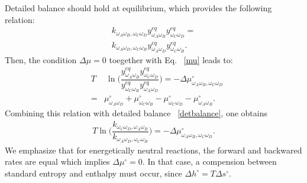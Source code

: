 \documentclass[
	amsmath,
	amssymb,
	a4paper,
	aip,		%
	jcp,		%
	reprint, twocolumn  %
	fleqn,
	showpacs,
	floatfix
]{revtex4-1}
\newcommand{\bea}{\begin{eqnarray}}
\newcommand{\eea}{\end{eqnarray}}
\begin{document}
Detailed balance should hold at equilibrium, which provides the following relation: 
\bea
k_{ \omega_{A} \omega_{B},\omega_{C} \omega_{D}  } y^{eq}_{ \omega_{A}  \omega_{B} } y^{eq}_{ \omega_{C} \omega_{D} } = \nonumber  \\
 k_{\omega_{A} \omega_{D} ,\omega_{C} \omega_{B} }  y^{eq}_{\omega_{A} \omega_{D} } y^{eq}_{\omega_{C} \omega_{B} }.
\label{detbalance}
\eea
Then, the condition $\Delta \mu=0$ toegether with Eq. ~\eqref{mu} leads to:
\bea
&T&\ \ln \bigg(\dfrac{y^{eq}_{\omega_{A} \omega_{B}} y^{eq}_{\omega_{C} \omega_{D}}}{y^{eq}_{\omega_{C}\omega_{B}} y^{eq}_{\omega_{A}\omega_{D}}} \bigg)   = -\Delta \mu^{\circ}_{\omega_{A}\omega_{B},\omega_{C}\omega_{D}} \nonumber  \\
&=&\mu^{\circ}_{\omega_{A}\omega_{D}} + \mu^{\circ}_{\omega_{C} \omega_{B}} - \mu^{\circ}_{\omega_{C}\omega_{D}} -\mu^{\circ}_{\omega_{A}\omega_{B}}  .
\label{gibbschange}
\eea
Combining this relation with detailed balance ~\eqref{detbalance}, one obtains
\begin{equation}
	\begin{split}
T \ln \bigg( \dfrac{k_{ \omega_{C} \omega_{D} , \omega_{A} \omega_{B} } }{k_{\omega_{A} \omega_{D} ,\omega_{C} \omega_{B} } } \bigg)   = -\Delta \mu^{\circ}_{\omega_{A}\omega_{B},\omega_{C}\omega_{D}} .
\end{split}
\label{gibbschange2}
\end{equation}
We emphasize that for energetically neutral reactions, the forward and backwared rates are equal 
which implies $\Delta \mu^{\circ}=0$. In that case, a compension between standard entropy and enthalpy must occur, since 
$\Delta h^{\circ}=T\Delta s^{\circ}$. 
\end{document}
